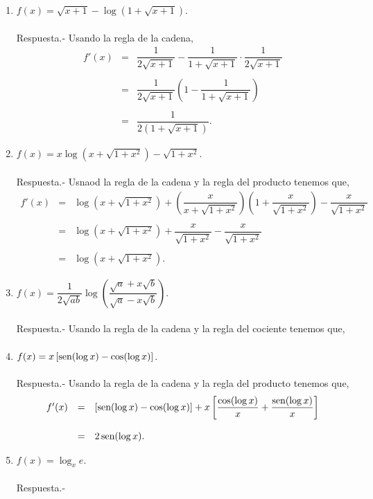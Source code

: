\begin{enumerate}[\bfseries 1.]
    \item $f(x)=\sqrt{x+1}-\log(1+\sqrt{x+1})$.\\\\
	Respuesta.-\; Usando la regla de la cadena,
	$$	
	\begin{array}{rcl}
	    f'(x) &=& \dfrac{1}{2\sqrt{x+1}}-\dfrac{1}{1+\sqrt{x+1}}\cdot \dfrac{1}{2\sqrt{x+1}}\\\\
		  &=& \dfrac{1}{2\sqrt{x+1}}\left(1-\dfrac{1}{1+\sqrt{x+1}}\right)\\\\
		  &=& \dfrac{1}{2\left(1+\sqrt{x+1}\right)}.
	\end{array}
	$$
	\vspace{.5cm}


    \item $f(x)=x\log\left(x+\sqrt{1+x^2}\right)-\sqrt{1+x^2}$.\\\\
	Respuesta.-\; Usnaod la regla de la cadena y la regla del producto tenemos que,
	$$
	\begin{array}{rcl}
	    f'(x) &=& \log\left(x+\sqrt{1+x^2}\right)+\left(\dfrac{x}{x+\sqrt{1+x^2}}\right)\left(1+\dfrac{x}{\sqrt{1+x^2}}\right)-\dfrac{x}{\sqrt{1+x^2}}\\\\
		  &=& \log\left(x+\sqrt{1+x^2}\right)+\dfrac{x}{\sqrt{1+x^2}}-\dfrac{x}{\sqrt{1+x^2}}\\\\
		  &=& \log\left(x+\sqrt{1+x^2}\right).
	\end{array}
	$$
	\vspace{.5cm}

    \item $f(x)=\dfrac{1}{2\sqrt{ab}}\log\left(\dfrac{\sqrt{a}+x\sqrt{b}}{\sqrt{a}-x\sqrt{b}}\right)$.\\\\
	Respuesta.-\; Usando la regla de la cadena y la regla del cociente tenemos que,
	$$
	\begin{array}{rcl}
	\end{array}
	$$

    \item $f(x)=x\left[\mathop{\mbox{\normalfont sen}}\nolimits(\log x)-\cos(\log x)\right]$.\\\\
	Respuesta.-\; Usando la regla de la cadena y la regla del producto tenemos que,
	$$
	\begin{array}{rcl}
	    f'(x) &=& \left[\mathop{\mbox{\normalfont sen}}\nolimits(\log x)-\cos(\log x)\right]+x\left[\dfrac{\cos(\log x)}{x}+\dfrac{\mathop{\mbox{\normalfont sen}}\nolimits(\log x)}{x}\right]\\\\
		  &=& 2\mathop{\mbox{\normalfont sen}}\nolimits(\log x).
	\end{array}
	$$
	\vspace{.5cm}

    \item $f(x)=\log_xe$.\\\\
	Respuesta.-\;

\end{enumerate}

